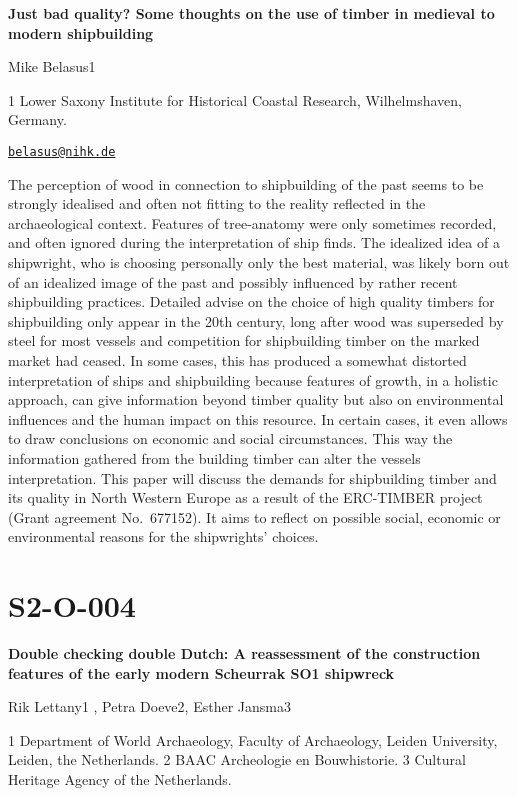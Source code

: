 \documentclass[
]{book}
\begin{document}
\textbf{Just bad quality? Some thoughts on the use of timber in medieval to modern shipbuilding}

Mike Belasus1

1 Lower Saxony Institute for Historical Coastal Research, Wilhelmshaven, Germany.

\href{mailto:belasus@nihk.de}{\nolinkurl{belasus@nihk.de}}

The perception of wood in connection to shipbuilding of the past seems to be strongly idealised and often not fitting to the reality reflected in the archaeological context. Features of tree-anatomy were only sometimes recorded, and often ignored during the interpretation of ship finds. The idealized idea of a shipwright, who is choosing personally only the best material, was likely born out of an idealized image of the past and possibly influenced by rather recent shipbuilding practices. Detailed advise on the choice of high quality timbers for shipbuilding only appear in the 20th century, long after wood was superseded by steel for most vessels and competition for shipbuilding timber on the marked market had ceased. In some cases, this has produced a somewhat distorted interpretation of ships and shipbuilding because features of growth, in a holistic approach, can give information beyond timber quality but also on environmental influences and the human impact on this resource. In certain cases, it even allows to draw conclusions on economic and social circumstances. This way the information gathered from the building timber can alter the vessels interpretation. This paper will discuss the demands for shipbuilding timber and its quality in North Western Europe as a result of the ERC-TIMBER project (Grant agreement No.~677152). It aims to reflect on possible social, economic or environmental reasons for the shipwrights' choices.

\hypertarget{s2-o-004}{%
\section*{S2-O-004}\label{s2-o-004}}

\textbf{Double checking double Dutch: A reassessment of the construction features of the early modern Scheurrak SO1 shipwreck}

Rik Lettany1 , Petra Doeve2, Esther Jansma3

1 Department of World Archaeology, Faculty of Archaeology, Leiden University, Leiden, the Netherlands. 2 BAAC Archeologie en Bouwhistorie. 3 Cultural Heritage Agency of the Netherlands.
\end{document}
